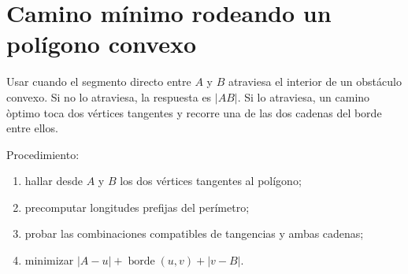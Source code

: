 \section{Camino m\'inimo rodeando un pol\'igono convexo}

Usar cuando el segmento directo entre $A$ y $B$ atraviesa el interior de un
obst\'aculo convexo. Si no lo atraviesa, la respuesta es $|AB|$. Si lo atraviesa,
un camino \`optimo toca dos v\'ertices tangentes y recorre una de las dos cadenas
del borde entre ellos.

Procedimiento:
\begin{enumerate}
  \item hallar desde $A$ y $B$ los dos v\'ertices tangentes al pol\'igono;
  \item precomputar longitudes prefijas del per\'imetro;
  \item probar las combinaciones compatibles de tangencias y ambas cadenas;
  \item minimizar $|A-u|+\operatorname{borde}(u,v)+|v-B|$.
\end{enumerate}


